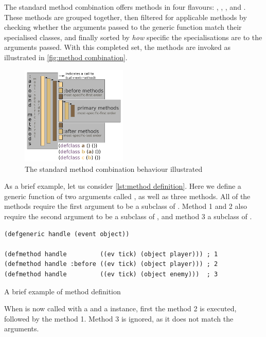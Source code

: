 \documentclass[a4paper]{paper}
\begin{document}
The standard method combination offers methods in four flavours: , , , and . These methods are grouped together, then filtered for applicable methods by checking whether the arguments passed to the generic function match their specialised classes, and finally sorted by \textit{how} specific the specialisations are to the arguments passed. With this completed set, the methods are invoked as illustrated in \autoref{fig:method combination}.

\begin{figure}[h]
  \centering
  \includegraphics[width=0.45\textwidth]{method combination.png}
  \caption{The standard method combination behaviour illustrated}
  \label{fig:method combination}
\end{figure}

As a brief example, let us consider \autoref{lst:method definition}. Here we define a generic function of two arguments called , as well as three methods. All of the methods require the first argument to be a subclass of . Method 1 and 2 also require the second argument to be a subclass of , and method 3 a subclass of .

\begin{listing}[h]
\begin{verbatim}
(defgeneric handle (event object))

(defmethod handle         ((ev tick) (object player))) ; 1
(defmethod handle :before ((ev tick) (object player))) ; 2
(defmethod handle         ((ev tick) (object enemy)))  ; 3
\end{verbatim}
\caption{A brief example of method definition}
\label{lst:method definition}
\end{listing}

\hypertarget{first-call}{When  is now called with a  and a  instance, first the method 2 is executed, followed by the method 1. Method 3 is ignored, as it does not match the arguments.}
\end{document}
